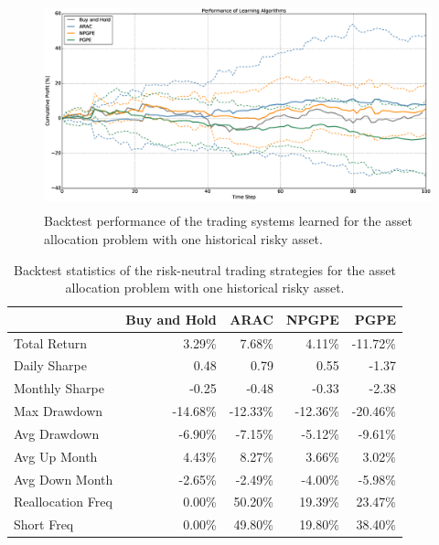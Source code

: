 \begin{figure}[t!]
	\centering
	\includegraphics[height=6cm,width=1.0\textwidth]{Images/8_9_single_hist_neutral_performance}
	\caption[Backtest performance with one historical risky asset]{Backtest performance of the trading systems learned for the asset allocation problem with one historical risky asset.}
	\label{fig:8_9_single_hist_neutral_performance}
\end{figure}

\begin{table}[t!]
\centering
\begin{tabular}{@{}lrrrr@{}}
\toprule
                  & Buy and Hold & ARAC     & NPGPE    & PGPE     \\ \midrule
Total Return      & 3.29\%       & 7.68\%   & 4.11\%   & -11.72\% \\
Daily Sharpe      & 0.48         & 0.79     & 0.55     & -1.37    \\
Monthly Sharpe    & -0.25        & -0.48    & -0.33    & -2.38    \\
Max Drawdown      & -14.68\%     & -12.33\% & -12.36\% & -20.46\% \\
Avg Drawdown      & -6.90\%      & -7.15\%  & -5.12\%  & -9.61\%  \\
Avg Up Month      & 4.43\%       & 8.27\%   & 3.66\%   & 3.02\%   \\
Avg Down Month    & -2.65\%      & -2.49\%  & -4.00\%  & -5.98\%  \\
Reallocation Freq & 0.00\%       & 50.20\%  & 19.39\%  & 23.47\%  \\
Short Freq        & 0.00\%       & 49.80\%  & 19.80\%  & 38.40\%  \\ \bottomrule
\end{tabular}
\caption[Backtest statistics for risk-neutral learning with one historical risky asset]{Backtest statistics of the risk-neutral trading strategies for the asset allocation problem with one historical risky asset.}
\label{tab:single_historical_neutral_performance}
\end{table}
\clearpage

